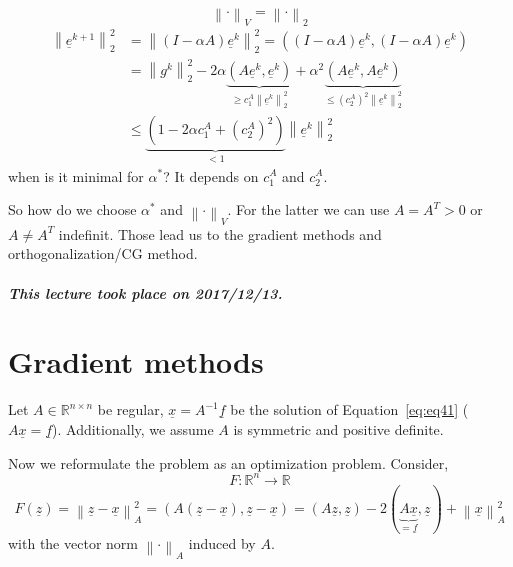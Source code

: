 \documentclass{article}
\newcommand{\norm}[1]{\left\|#1\right\|}
\newcommand{\dateref}[1]{\paragraph{\textit{This lecture took place on #1.}}}
\begin{document}
\[ \norm{\cdot}_V = \norm{\cdot}_2 \]
\begin{align*}
  \norm{\underline{e}^{k+1}}_2^2 &= \norm{(I - \alpha A) \underline{e}^k}_2^2 = \left((I - \alpha A) \underline{e}^k, (I - \alpha A) \underline{e}^k\right) \\
    &= \norm{g^k}_2^2 - 2 \alpha \underbrace{(A \underline{e}^k, \underline{e}^k)}_{\geq c_1^A \norm{\underline{e}^k}_2^2} + \alpha^2 \underbrace{(A \underline{e}^k, A \underline{e}^k)}_{\leq (c_2^A)^2 \norm{\underline{e}^k}_2^2} \\
    &\leq \underbrace{(1 - 2 \alpha c_1^A + (c_2^A)^2)}_{< 1} \norm{\underline{e}^k}_2^2
\end{align*}
when is it minimal for $\alpha^*$? It depends on $c_1^A$ and $c_2^A$.

So how do we choose $\alpha^*$ and $\norm{\cdot}_V$. For the latter we can use $A = A^T > 0$ or $A \neq A^T$ indefinit.
Those lead us to the gradient methods and orthogonalization/CG method.


\dateref{2017/12/13}

\section{Gradient methods}

Let $A \in \mathbb R^{n\times n}$ be regular, $\underline{x} = A^{-1} \underline{f}$ be the solution of Equation~\ref{eq:eq41} ($A \underline{x} = \underline{f}$).
Additionally, we assume $A$ is symmetric and positive definite.

Now we reformulate the problem as an optimization problem. Consider,
\[ F: \mathbb R^n \to \mathbb R \]
\[ F(\underline{z}) = \norm{\underline{z} - \underline{x}}_A^2 = (A(\underline{z} - \underline{x}), \underline{z} - \underline{x}) = (A \underline{z}, \underline{z}) - 2 (\underbrace{A \underline{x}}_{= \underline{f}}, \underline{z}) + \norm{\underline{x}}_A^2 \]
with the vector norm $\norm{\cdot}_A$ induced by $A$.
\end{document}
